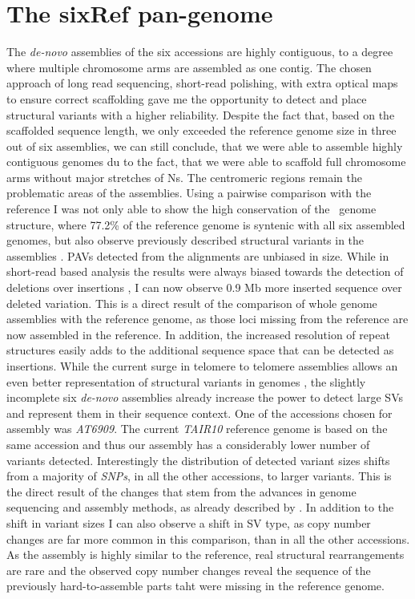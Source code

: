 \section{The sixRef pan-genome}
\label{sec:theSixRefPanGenome}

The \textit{de-novo} assemblies of the six accessions are highly contiguous, to a degree where multiple chromosome arms are assembled as one contig. The chosen approach of long read sequencing, short-read polishing, with extra optical maps to ensure correct scaffolding gave me the opportunity to detect and place structural variants with a higher reliability. Despite the fact that, based on the scaffolded sequence length, we only exceeded the reference genome size in three out of six assemblies, we can still conclude, that we were able to assemble highly contiguous genomes du to the fact, that we were able to scaffold full chromosome arms without major stretches of Ns. The centromeric regions remain the problematic areas of the assemblies. Using a pairwise comparison with the reference I was not only able to show the high conservation of the \ath\ genome structure, where 77.2\% of the reference genome is syntenic with all six assembled genomes, but also observe previously described structural variants in the assemblies \citep{Zapata2016-iq,Rowan2019-ut,Jiao2020-yz}. PAVs detected from the alignments are unbiased in size. While in short-read based analysis the results were always biased towards the detection of deletions over insertions \citep{Kosugi2019-ls,Ho2020-mt}, I can now observe 0.9 Mb more inserted sequence over deleted variation. This is a direct result of the comparison of whole genome assemblies with the reference genome, as those loci missing from the reference are now assembled in the reference. In addition, the increased resolution of repeat structures easily adds to the additional sequence space that can be detected as insertions. While the current surge in telomere to telomere assemblies allows an even better representation of structural variants in genomes \citep{Gonzalez_de_la_Rosa2021-kz,Giguere2021-sy,Wang2021-vc}, the slightly incomplete six \textit{de-novo} assemblies already increase the power to detect large SVs and represent them in their sequence context. \newline
One of the accessions chosen for assembly was \textit{AT6909}. The current \textit{TAIR10} reference genome \citep{Berardini2015-is} is based on the same accession and thus our assembly has a considerably lower number of variants detected. Interestingly the distribution of detected variant sizes shifts from a majority of \textit{SNPs}, in all the other accessions, to larger variants. This is the direct result of the changes that stem from the advances in genome sequencing and assembly methods, as already described by \citep{Wang2021-vc}. In addition to the shift in variant sizes I can also observe a shift in SV type, as copy number changes are far more common in this comparison, than in all the other accessions. As the assembly is highly similar to the reference, real structural rearrangements are rare and the observed copy number changes reveal the sequence of the previously hard-to-assemble parts taht were missing in the reference genome. \newline
